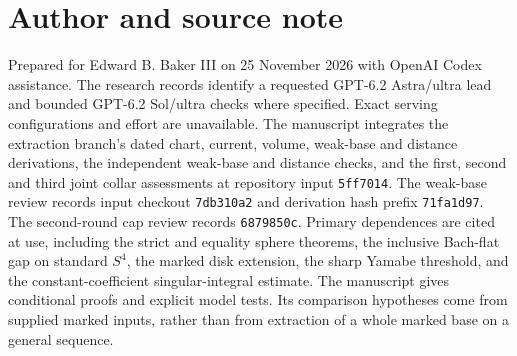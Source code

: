 \documentclass[11pt]{article}
\theoremstyle{definition}
\theoremstyle{remark}
\begin{document}
\section*{Author and source note}
Prepared for Edward B. Baker III on 25 November 2026 with OpenAI Codex assistance. The research records identify a requested GPT-6.2 Astra/ultra lead and bounded GPT-6.2 Sol/ultra checks where specified. Exact serving configurations and effort are unavailable. The manuscript integrates the extraction branch's dated chart, current, volume, weak-base and distance derivations, the independent weak-base and distance checks, and the first, second and third joint collar assessments at repository input \texttt{5ff7014}. The weak-base review records input checkout \texttt{7db310a2} and derivation hash prefix \texttt{71fa1d97}. The second-round cap review records \texttt{6879850c}. Primary dependences are cited at use, including the strict and equality sphere theorems, the inclusive Bach-flat gap on standard \(S^4\), the marked disk extension, the sharp Yamabe threshold, and the constant-coefficient singular-integral estimate. The manuscript gives conditional proofs and explicit model tests. Its comparison hypotheses come from supplied marked inputs, rather than from extraction of a whole marked base on a general sequence.



\end{document}
